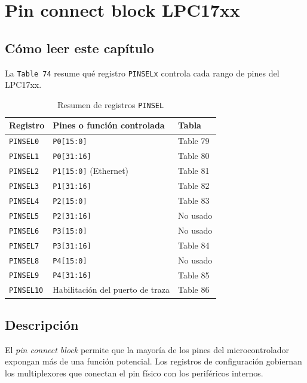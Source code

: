 \setcounter{section}{7}
\section{Pin connect block LPC17xx}
\subsection{Cómo leer este capítulo}
La \texttt{Table 74} resume qué registro \texttt{PINSELx} controla cada rango de pines del LPC17xx.

\begin{table}[H]
  \centering
  \small
  \renewcommand{\arraystretch}{1.15}
  \caption{Resumen de registros \texttt{PINSEL}}
  \begin{tabularx}{0.92\textwidth}{|>{\raggedright\arraybackslash}p{}|>{\raggedright\arraybackslash}X|>{\raggedright\arraybackslash}p{}|}
    \hline
    \textbf{Registro} & \textbf{Pines o función controlada} & \textbf{Tabla} \\
    \hline
    \texttt{PINSEL0} & \texttt{P0[15:0]} & Table 79 \\
    \hline
    \texttt{PINSEL1} & \texttt{P0[31:16]} & Table 80 \\
    \hline
    \texttt{PINSEL2} & \texttt{P1[15:0]} (Ethernet) & Table 81 \\
    \hline
    \texttt{PINSEL3} & \texttt{P1[31:16]} & Table 82 \\
    \hline
    \texttt{PINSEL4} & \texttt{P2[15:0]} & Table 83 \\
    \hline
    \texttt{PINSEL5} & \texttt{P2[31:16]} & No usado \\
    \hline
    \texttt{PINSEL6} & \texttt{P3[15:0]} & No usado \\
    \hline
    \texttt{PINSEL7} & \texttt{P3[31:16]} & Table 84 \\
    \hline
    \texttt{PINSEL8} & \texttt{P4[15:0]} & No usado \\
    \hline
    \texttt{PINSEL9} & \texttt{P4[31:16]} & Table 85 \\
    \hline
    \texttt{PINSEL10} & Habilitación del puerto de traza & Table 86 \\
    \hline
  \end{tabularx}
\end{table}

\subsection{Descripción}
El \textit{pin connect block} permite que la mayoría de los pines del microcontrolador expongan más de una función potencial. Los registros de configuración gobiernan los multiplexores que conectan el pin físico con los periféricos internos.

